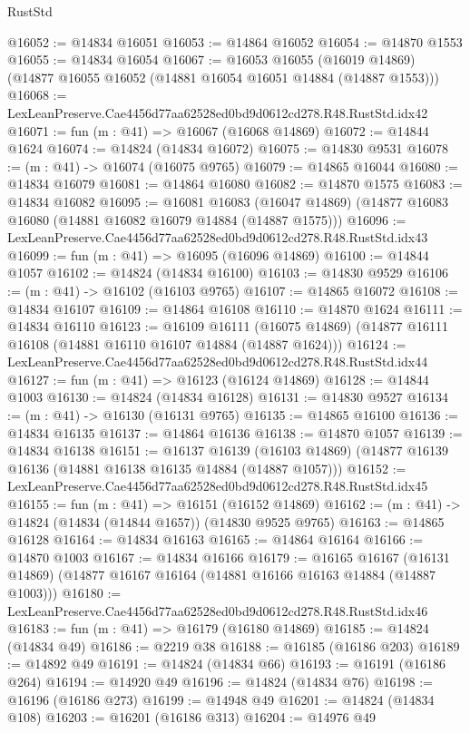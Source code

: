 \begin{lexlean}{RustStd}
\begin{coremodule}
@16052 := @14834 @16051
@16053 := @14864 @16052
@16054 := @14870 @1553
@16055 := @14834 @16054
@16067 := @16053
    @16055
    (@16019 @14869)
    (@14877 @16055 @16052 (@14881 @16054 @16051 @14884 (@14887 @1553)))
@16068 := LexLeanPreserve.Cae4456d77aa62528ed0bd9d0612cd278.R48.RustStd.idx42
@16071 := fun (m : @41) => @16067 (@16068 @14869)
@16072 := @14844 @1624
@16074 := @14824 (@14834 @16072)
@16075 := @14830 @9531
@16078 := (m : @41) -> @16074 (@16075 @9765)
@16079 := @14865 @16044
@16080 := @14834 @16079
@16081 := @14864 @16080
@16082 := @14870 @1575
@16083 := @14834 @16082
@16095 := @16081
    @16083
    (@16047 @14869)
    (@14877 @16083 @16080 (@14881 @16082 @16079 @14884 (@14887 @1575)))
@16096 := LexLeanPreserve.Cae4456d77aa62528ed0bd9d0612cd278.R48.RustStd.idx43
@16099 := fun (m : @41) => @16095 (@16096 @14869)
@16100 := @14844 @1057
@16102 := @14824 (@14834 @16100)
@16103 := @14830 @9529
@16106 := (m : @41) -> @16102 (@16103 @9765)
@16107 := @14865 @16072
@16108 := @14834 @16107
@16109 := @14864 @16108
@16110 := @14870 @1624
@16111 := @14834 @16110
@16123 := @16109
    @16111
    (@16075 @14869)
    (@14877 @16111 @16108 (@14881 @16110 @16107 @14884 (@14887 @1624)))
@16124 := LexLeanPreserve.Cae4456d77aa62528ed0bd9d0612cd278.R48.RustStd.idx44
@16127 := fun (m : @41) => @16123 (@16124 @14869)
@16128 := @14844 @1003
@16130 := @14824 (@14834 @16128)
@16131 := @14830 @9527
@16134 := (m : @41) -> @16130 (@16131 @9765)
@16135 := @14865 @16100
@16136 := @14834 @16135
@16137 := @14864 @16136
@16138 := @14870 @1057
@16139 := @14834 @16138
@16151 := @16137
    @16139
    (@16103 @14869)
    (@14877 @16139 @16136 (@14881 @16138 @16135 @14884 (@14887 @1057)))
@16152 := LexLeanPreserve.Cae4456d77aa62528ed0bd9d0612cd278.R48.RustStd.idx45
@16155 := fun (m : @41) => @16151 (@16152 @14869)
@16162 := (m : @41) -> @14824 (@14834 (@14844 @1657)) (@14830 @9525 @9765)
@16163 := @14865 @16128
@16164 := @14834 @16163
@16165 := @14864 @16164
@16166 := @14870 @1003
@16167 := @14834 @16166
@16179 := @16165
    @16167
    (@16131 @14869)
    (@14877 @16167 @16164 (@14881 @16166 @16163 @14884 (@14887 @1003)))
@16180 := LexLeanPreserve.Cae4456d77aa62528ed0bd9d0612cd278.R48.RustStd.idx46
@16183 := fun (m : @41) => @16179 (@16180 @14869)
@16185 := @14824 (@14834 @49)
@16186 := @2219 @38
@16188 := @16185 (@16186 @203)
@16189 := @14892 @49
@16191 := @14824 (@14834 @66)
@16193 := @16191 (@16186 @264)
@16194 := @14920 @49
@16196 := @14824 (@14834 @76)
@16198 := @16196 (@16186 @273)
@16199 := @14948 @49
@16201 := @14824 (@14834 @108)
@16203 := @16201 (@16186 @313)
@16204 := @14976 @49

\end{coremodule}
\end{lexlean}
